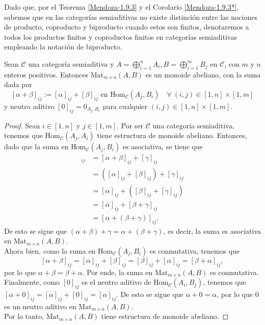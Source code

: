 \documentclass[tesis]{subfiles}
\begin{document}
\begin{Nota}
    Dado que, por el Teorema \ref{Mendoza-1.9.3} y el Corolario \ref{Mendoza-1.9.3*}, sabemos que en las categorías semiaditivas no existe distinción entre las nociones de producto, coproducto y biproducto cuando estos son finitos, denotaremos a todos los productos finitos y coproductos finitos en categorías semiaditivas empleando la notación de biproducto.
\end{Nota}

\begin{Prop}\label{Mendoza-Ej.44}
    Sean $\mathscr{C}$ una categoría semiaditiva y $A = \bigoplus_{i=1}^n A_i, B=\bigoplus_{i=1}^m B_j$ en $\mathscr{C}$, con $m$ y $n$ enteros positivos. Entonces $\text{Mat}_{m \times n}(A,B)$ es un monoide abeliano, con la suma dada por 
\[
    [\alpha+\beta]_{ij}:=[\alpha]_{ij}+[\beta]_{ij} \text{ en } \text{Hom}_{\mathscr{C}}(A_j,B_i)\quad \forall \ (i,j)\in[1,n]\times[1,m]
\]
y neutro aditivo $[0]_{ij} = 0_{A_j,B_i}$ para cualquier $(i,j)\in[1,n]\times[1,m]$.
\end{Prop}

\begin{proof}
    Sean $i \in [1,n]$ y $j \in [1,m]$. Por ser $\mathscr{C}$ una categoría semiaditiva, tenemos que $\text{Hom}_{\mathscr{C}}(A_j,A_i)$ tiene estructura de monoide abeliano. Entonces, dado que la suma en $\text{Hom}_{\mathscr{C}}(A_j,B_i)$ es asociativa, se tiene que 
\begin{align*}
    [(\alpha + \beta)+\gamma]_{ij}&= [\alpha+\beta]_{ij} + [\gamma]_{ij} \\ &=([\alpha]_{ij} + [\beta]_{ij})+[\gamma]_{ij}\\
    &= [\alpha]_{ij} + ([\beta]_{ij}+[\gamma]_{ij})\\
    &=[\alpha]_{ij} + [\beta+\gamma]_{ij} \\
    &= [\alpha+(\beta+\gamma)]_{ij}.
\end{align*}
De esto se sigue que $(\alpha+\beta)+\gamma = \alpha+(\beta+\gamma)$, es decir, la suma es asociativa en $\text{Mat}_{m \times n}(A,B).$\\

Ahora bien, como la suma en $\text{Hom}_{\mathscr{C}}(A_j,B_i)$ es conmutativa, tenemos que 
\[ [\alpha+\beta]_{ij} = [\alpha]_{ij}+[\beta]_{ij} = [\beta]_{ij}+[\alpha]_{ij} = [\beta+\alpha]_{ij},\]
por lo que $\alpha+\beta = \beta+\alpha$. Por ende, la suma en $\text{Mat}_{m \times n}(A,B)$ es conmutativa.\\

Finalmente, como $[0]_{ij}$ es el neutro aditivo de $\text{Hom}_{\mathscr{C}}(A_i, B_j)$, tenemos que $[\alpha+0]_{ij} = [\alpha]_{ij} + [0]_{ij} = [\alpha]_{ij}.$ De esto se sigue que $\alpha+0 = \alpha$, por lo que $0$ es un neutro aditivo en $\text{Mat}_{m\times n}(A,B).$\\

Por lo tanto, $\text{Mat}_{m\times n}(A,B)$ tiene estructura de monoide abeliano.
\end{proof}
\end{document}
